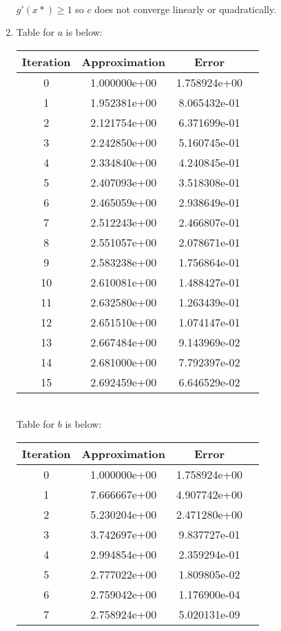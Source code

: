 \documentclass{article}
\begin{document}
\begin{enumerate}
\begin{align*}
\end{align*}
$g'(x*) \geq 1$ so $c$ does not converge linearly or quadratically. 
\item Table for $a$ is below: \\
\begin{tabular}{|c|c|c|c|}
\hline
Iteration & Approximation & Error\\
\hline
0 & 1.000000e+00 & 1.758924e+00\\
\hline
1 & 1.952381e+00 & 8.065432e-01\\
\hline
2 & 2.121754e+00 & 6.371699e-01\\
\hline
3 & 2.242850e+00 & 5.160745e-01\\
\hline
4 & 2.334840e+00 & 4.240845e-01\\
\hline
5 & 2.407093e+00 & 3.518308e-01\\
\hline
6 & 2.465059e+00 & 2.938649e-01\\
\hline
7 & 2.512243e+00 & 2.466807e-01\\
\hline
8 & 2.551057e+00 & 2.078671e-01\\
\hline
9 & 2.583238e+00 & 1.756864e-01\\
\hline
10 & 2.610081e+00 & 1.488427e-01\\
\hline
11 & 2.632580e+00 & 1.263439e-01\\
\hline
12 & 2.651510e+00 & 1.074147e-01\\
\hline
13 & 2.667484e+00 & 9.143969e-02\\
\hline
14 & 2.681000e+00 & 7.792397e-02\\
\hline
15 & 2.692459e+00 & 6.646529e-02\\
\hline
\end{tabular}\\
Table for $b$ is below: \\
\begin{tabular}{|c|c|c|c|}
\hline
Iteration & Approximation & Error\\
\hline
0 & 1.000000e+00 & 1.758924e+00\\
\hline
1 & 7.666667e+00 & 4.907742e+00\\
\hline
2 & 5.230204e+00 & 2.471280e+00\\
\hline
3 & 3.742697e+00 & 9.837727e-01\\
\hline
4 & 2.994854e+00 & 2.359294e-01\\
\hline
5 & 2.777022e+00 & 1.809805e-02\\
\hline
6 & 2.759042e+00 & 1.176900e-04\\
\hline
7 & 2.758924e+00 & 5.020131e-09\\

\end{tabular}
\end{enumerate}
\end{document}
